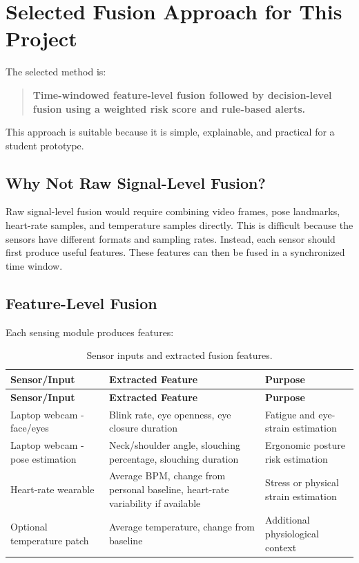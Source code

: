 \documentclass[11pt,a4paper]{article}
\begin{document}
\section{Selected Fusion Approach for This Project}

The selected method is:

\begin{quote}
\textbf{Time-windowed feature-level fusion followed by decision-level fusion using a weighted risk score and rule-based alerts.}
\end{quote}

This approach is suitable because it is simple, explainable, and practical for a student prototype.

\subsection{Why Not Raw Signal-Level Fusion?}
Raw signal-level fusion would require combining video frames, pose landmarks, heart-rate samples, and temperature samples directly. This is difficult because the sensors have different formats and sampling rates. Instead, each sensor should first produce useful features. These features can then be fused in a synchronized time window.

\subsection{Feature-Level Fusion}
Each sensing module produces features:

\begin{longtable}{p{}p{}p{}}
\caption{Sensor inputs and extracted fusion features.}\\
\toprule
\textbf{Sensor/Input} & \textbf{Extracted Feature} & \textbf{Purpose} \\
\midrule
\endfirsthead
\toprule
\textbf{Sensor/Input} & \textbf{Extracted Feature} & \textbf{Purpose} \\
\midrule
\endhead
Laptop webcam - face/eyes & Blink rate, eye openness, eye closure duration & Fatigue and eye-strain estimation \\
Laptop webcam - pose estimation & Neck/shoulder angle, slouching percentage, slouching duration & Ergonomic posture risk estimation \\
Heart-rate wearable & Average BPM, change from personal baseline, heart-rate variability if available & Stress or physical strain estimation \\
Optional temperature patch & Average temperature, change from baseline & Additional physiological context \\
\bottomrule
\end{longtable}
\end{document}
